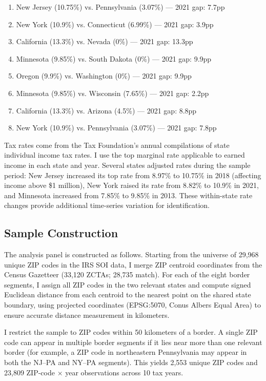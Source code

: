 \documentclass[12pt]{article}
\begin{document}
\begin{enumerate}
\item New Jersey (10.75\%) vs. Pennsylvania (3.07\%) --- 2021 gap: 7.7pp
\item New York (10.9\%) vs. Connecticut (6.99\%) --- 2021 gap: 3.9pp
\item California (13.3\%) vs. Nevada (0\%) --- 2021 gap: 13.3pp
\item Minnesota (9.85\%) vs. South Dakota (0\%) --- 2021 gap: 9.9pp
\item Oregon (9.9\%) vs. Washington (0\%) --- 2021 gap: 9.9pp
\item Minnesota (9.85\%) vs. Wisconsin (7.65\%) --- 2021 gap: 2.2pp
\item California (13.3\%) vs. Arizona (4.5\%) --- 2021 gap: 8.8pp
\item New York (10.9\%) vs. Pennsylvania (3.07\%) --- 2021 gap: 7.8pp
\end{enumerate}

Tax rates come from the Tax Foundation's annual compilations of state individual income tax rates. I use the top marginal rate applicable to earned income in each state and year. Several states adjusted rates during the sample period: New Jersey increased its top rate from 8.97\% to 10.75\% in 2018 (affecting income above \$1 million), New York raised its rate from 8.82\% to 10.9\% in 2021, and Minnesota increased from 7.85\% to 9.85\% in 2013. These within-state rate changes provide additional time-series variation for identification.

\subsection{Sample Construction}

The analysis panel is constructed as follows. Starting from the universe of 29,968 unique ZIP codes in the IRS SOI data, I merge ZIP centroid coordinates from the Census Gazetteer (33,120 ZCTAs; 28,735 match). For each of the eight border segments, I assign all ZIP codes in the two relevant states and compute signed Euclidean distance from each centroid to the nearest point on the shared state boundary, using projected coordinates (EPSG:5070, Conus Albers Equal Area) to ensure accurate distance measurement in kilometers.

I restrict the sample to ZIP codes within 50 kilometers of a border. A single ZIP code can appear in multiple border segments if it lies near more than one relevant border (for example, a ZIP code in northeastern Pennsylvania may appear in both the NJ--PA and NY--PA segments). This yields 2,553 unique ZIP codes and 23,809 ZIP-code $\times$ year observations across 10 tax years.
\end{document}

